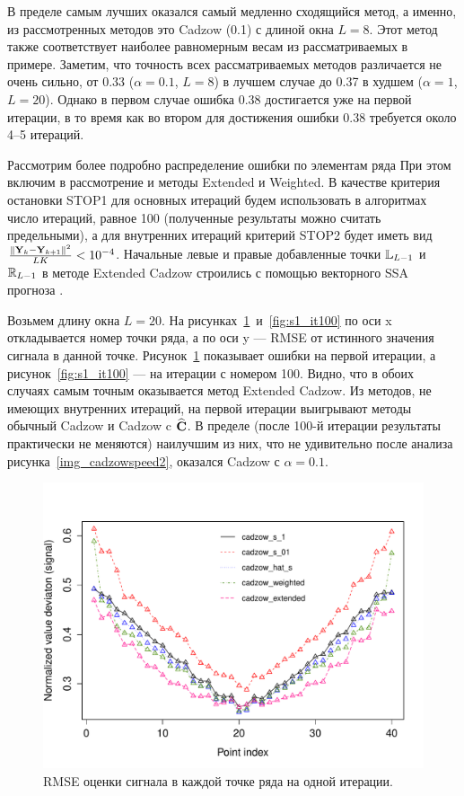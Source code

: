 \documentclass[12pt,a4paper,fleqn,leqno]{article}
\begin{document}
В пределе самым лучших оказался самый медленно сходящийся метод, а именно, из рассмотренных методов это Cadzow (0.1) с длиной окна $L=8$.
Этот метод также соответствует наиболее равномерным весам из рассматриваемых в примере.
Заметим, что точность всех рассматриваемых методов различается не очень сильно, от 0.33 ($\alpha=0.1$, $L=8$) в лучшем случае до 0.37 в худшем
($\alpha=1$, $L=20$). Однако в первом случае ошибка 0.38 достигается уже на первой итерации, в то время как во втором для
достижения ошибки 0.38 требуется около 4--5 итераций.

Рассмотрим более подробно распределение ошибки по элементам ряда При этом включим в рассмотрение и
методы Extended и Weighted.
В качестве критерия остановки STOP1 для основных итераций будем использовать в алгоритмах число итераций, равное 100 (полученные результаты
можно считать предельными), а для внутренних итераций критерий STOP2 будет иметь вид $\frac{\|\mathbf{Y}_k - \mathbf{Y}_{k+1}\|^2}{LK} < 10^{-4}$.
Начальные левые и правые добавленные точки $\mathbb{L}_{L-1}$ и $\mathbb{R}_{L-1}$
в методе Extended Cadzow строились с помощью векторного SSA прогноза \cite[раздел 2.3.1]{Golyandina.etal2001}.

Возьмем длину окна $L=20$.  На рисунках~\ref{fig:s1_it1}~и~\ref{fig:s1_it100} по оси x откладывается номер точки ряда,
а по оси y --- RMSE от истинного значения сигнала в данной точке. Рисунок~\ref{fig:s1_it1} показывает ошибки на первой итерации,
а рисунок~\ref{fig:s1_it100} --- на итерации с номером 100.
Видно, что в обоих случаях самым точным оказывается метод Extended Cadzow. Из методов, не имеющих внутренних итераций,
на первой итерации выигрывают методы обычный Cadzow и Cadzow c $\widehat{\mathbf{C}}$. В пределе (после 100-й итерации результаты практически не меняются)
наилучшим из них, что не удивительно после анализа рисунка~\ref{img_cadzowspeed2}, оказался Cadzow с $\alpha=0.1$.

\begin{figure}[!hhh]
\begin{center}
\includegraphics[width = 13cm]{s1_it1.pdf}
\caption{RMSE оценки сигнала в каждой точке ряда на одной итерации.}
\label{fig:s1_it1}
\end{center}
\end{figure}
\end{document}
